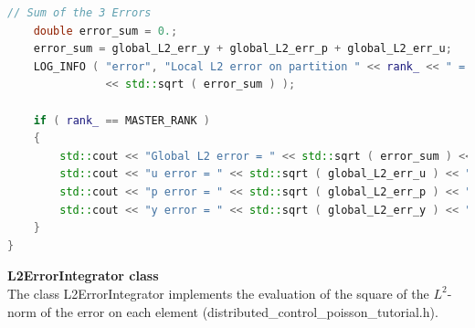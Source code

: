 \documentclass[a4paper, 11pt, twoside]{article}
\begin{document}
\begin{lstlisting}[language=C++, basicstyle={\footnotesize, \ttfamily}, keywordstyle=\color{blue}, numbers=none, tabsize=4]
    // Sum of the 3 Errors
    double error_sum = 0.;
    error_sum = global_L2_err_y + global_L2_err_p + global_L2_err_u;
    LOG_INFO ( "error", "Local L2 error on partition " << rank_ << " = "
               << std::sqrt ( error_sum ) );

    if ( rank_ == MASTER_RANK )
    {
        std::cout << "Global L2 error = " << std::sqrt ( error_sum ) << "\n";
        std::cout << "u error = " << std::sqrt ( global_L2_err_u ) << "\n";
        std::cout << "p error = " << std::sqrt ( global_L2_err_p ) << "\n";
        std::cout << "y error = " << std::sqrt ( global_L2_err_y ) << "\n";
    }
}

\end{lstlisting}

\textbf{L2ErrorIntegrator class}\\
The class L2ErrorIntegrator implements the evaluation of the square of the $L^2$-norm of the error on each element (distributed\_control\_poisson\_tutorial.h).
\end{document}

